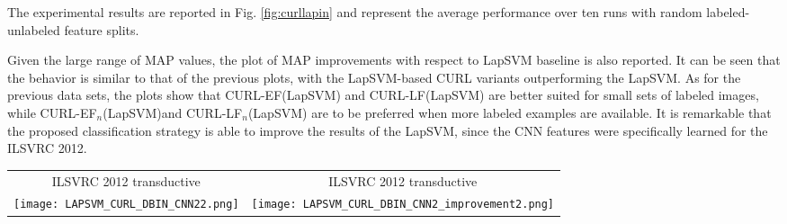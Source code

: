 \documentclass[journal,11pt]{IEEEtran}
\newcommand{\coso}{strategy}
\newcommand{\curllaplf}{CURL-LF(LapSVM)}
\newcommand{\curllaplfn}{CURL-LF$_n$(LapSVM)}
\newcommand{\curllapef}{CURL-EF(LapSVM)}
\newcommand{\curllapefn}{CURL-EF$_n$(LapSVM)}
\begin{document}
The experimental results are reported in Fig. \ref{fig:curllapin} and represent the average performance over ten runs with random labeled-unlabeled feature splits.

Given the large range of MAP values, the plot of MAP improvements with respect to LapSVM baseline is also reported. It can be seen that the behavior is similar to that of the previous plots, with the LapSVM-based CURL variants outperforming the LapSVM. As for the previous data sets, the plots show that \curllapef{ }and \curllaplf{ }are better suited for small sets of labeled images, while \curllapefn and \curllaplfn{ }are to be preferred when more labeled examples are available. It is remarkable that the proposed classification \coso{ }is able to improve the results of the LapSVM, since the CNN features were specifically learned for the ILSVRC 2012.


\begin{figure*}[!htbp]%
\centering
\begin{tabular}{cc}
\footnotesize{ILSVRC 2012 transductive}  & \footnotesize{ILSVRC 2012 transductive}  \\
\texttt{[image: LAPSVM\_CURL\_DBIN\_CNN22.png]} &
\texttt{[image: LAPSVM\_CURL\_DBIN\_CNN2\_improvement2.png]} \\
\end{tabular}
\caption{Mean Average Precision (MAP) varying the number of labeled images per class, obtained on the ILSVRC 2012 data set: MAP values (left) and MAP improvements over LapSVM baseline (right). Results are obtained using GIST, PHOG, LBP and CNN features.}%
\label{fig:curllapin}%
\end{figure*}



%
%
\end{document}
